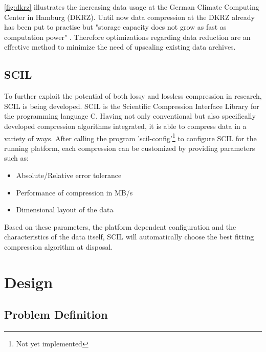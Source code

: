 \documentclass[
	12pt,
	a4paper,
	BCOR10mm,
	DIV14,
	headsepline,
]{scrreprt}
\begin{document}
\cref{fig:dkrz} illustrates the increasing data usage at the German Climate
Computing Center in Hamburg (DKRZ). Until now data compression at the DKRZ
already has been put to practise but "storage capacity does not grow as fast as
computation power" \cite{strg_cap}. Therefore optimizations regarding data
reduction are an effective method to minimize the need of upscaling existing
data archives.

\clearpage

\section{SCIL}

To further exploit the potential of both lossy and lossless compression in
research, SCIL is being developed. SCIL is the Scientific Compression Interface
Library for the programming language C. Having not only conventional but also
specifically developed compression algorithms integrated, it is able to compress
data in a variety of ways. After calling the program
'scil-config'\footnote{Not yet implemented} to configure SCIL for the running
platform, each compression can be customized by providing parameters such as:

\bigskip

\begin{itemize}
	\item Absolute/Relative error tolerance
	\item Performance of compression in MB/s
	\item Dimensional layout of the data
\end{itemize}

\bigskip

Based on these parameters, the platform dependent configuration and the
characteristics of the data itself, SCIL will automatically choose the best
fitting compression algorithm at disposal\footnotemark[\value{footnote}].\par

\setcounter{footnote}{0}

\chapter{Design}
\label{Design}

\section{Problem Definition}

\bigskip
\end{document}

